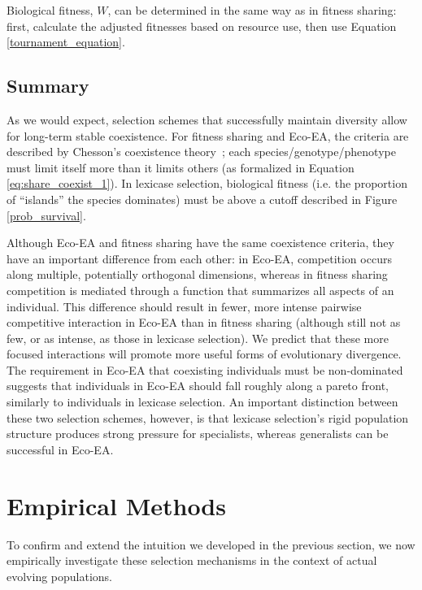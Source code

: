 Biological fitness, $W$, can be determined in the same way as in fitness sharing: first, calculate the adjusted fitnesses based on resource use, then use Equation \ref{tournament_equation}. 

\subsection{Summary}

As we would expect, selection schemes that successfully maintain diversity allow for long-term stable coexistence. For fitness sharing and Eco-EA, the criteria are described by Chesson's coexistence theory~\cite{chesson_mechanisms_2000}; each species/genotype/phenotype must limit itself more than it limits others (as formalized in Equation \ref{eq:share_coexist_1}). In lexicase selection, biological fitness (i.e. the proportion of ``islands'' the species dominates) must be above a cutoff described in Figure \ref{prob_survival}.

Although Eco-EA and fitness sharing have the same coexistence criteria, they have an important difference from each other: in Eco-EA, competition occurs along multiple, potentially orthogonal dimensions, whereas in fitness sharing competition is mediated through a function that summarizes all aspects of an individual. This difference should result in fewer, more intense pairwise competitive interaction in Eco-EA than in fitness sharing (although still not as few, or as intense, as those in lexicase selection). We predict that these more focused interactions will promote more useful forms of evolutionary divergence. The requirement in Eco-EA that coexisting individuals must be non-dominated suggests that individuals in Eco-EA should fall roughly along a pareto front, similarly to individuals in lexicase selection. An important distinction between these two selection schemes, however, is that lexicase selection's rigid population structure produces strong pressure for specialists, whereas generalists can be successful in Eco-EA.

\section{Empirical Methods}

To confirm and extend the intuition we developed in the previous section, we now empirically investigate these selection mechanisms in the context of actual evolving populations. 

